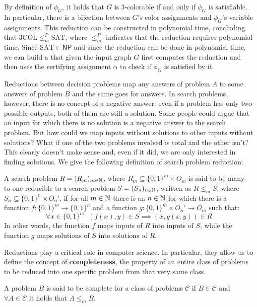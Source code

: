 By definition of $\phi_G$, it holds that $G$ is 3-colorable if and only if $\phi_G$ is satisfiable. In particular, there is a bijection between $G$'s color assignments and $\phi_G$'s variable assignments. This reduction can be constructed in polynomial time, concluding that $3\mathrm{COL} \leq_m^P \mathrm{SAT}$, where $\leq_m^P$ indicates that the reduction requires polynomial time. Since $\mathrm{SAT} \in \mathsf{NP}$ and since the reduction can be done in polynomial time, we can build a \TM that given the input graph $G$ first computes the reduction and then uses the certifying assignment $\alpha$ to check if $\phi_G$ is satisfied by it. 

Reductions between decision problems map any  answers of problem $A$ to some  answers of problem $B$ and the same goes for  answers. In search problems, however, there is no concept of a negative answer: even if a problem has only two possible outputs, both of them are still a solution. Some people could argue that an input for which there is no solution is a negative answer to the search problem. But how could we map inputs without solutions to other inputs without solutions? What if one of the two problems involved is total and the other isn't? This clearly doesn't make sense and, even if it did, we are only interested in finding solutions. We give the following definition of search problem reduction:

\begin{definition}
 A search problem $R = (R_m)_{m \in \mathbb{N}}$, where $R_m \subseteq \{0,1\}^m \times O_m$ is said to be many-to-one reducible to a search problem $S = (S_n)_{n \in \mathbb{N}}$, written as $R \leq_m S$, where $S_n \subseteq \{0,1\}^n \times O_n'$, if for all $m \in \mathbb{N}$ there is an $n \in \mathbb{N}$ for which there is a function $f : \{0,1\}^m \to \{0,1\}^n$ and a function $g : \{0,1\}^m \times O_n' \to O_m$ such that:
    \[\forall x \in \{0,1\}^m \;\; (f(x), y) \in S \implies (x, g(x,y)) \in R\]
 In other words, the function $f$ maps inputs of $R$ into inputs of $S$, while the function $g$ maps solutions of $S$ into solutions of $R$. 
\end{definition}

Reductions play a critical role in computer science. In particular, they allow us to define the concept of \textbf{completeness}, the property of an entire class of problems to be reduced into one specific problem from that very same class.

\begin{definition}
 A problem $B$ is said to be complete for a class of problems $\mathcal{C}$ if $B \in \mathcal{C}$ and $\forall A \in \mathcal{C}$ it holds that $A \leq_m B$.
\end{definition}


